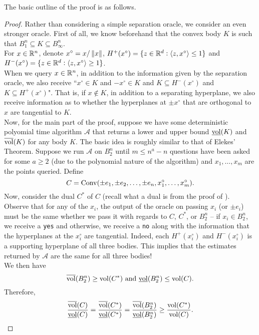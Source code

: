 The basic outline of the proof is as follows.\\

\begin{proof}
	Rather than considering a simple separation oracle, we consider an even stronger oracle. First of all, we know beforehand that the convex body $K$ is such that $B_1^n\subseteq K\subseteq B_\infty^n$.\\
	For $x\in\mathbb{R}^n$, denote $x^\circ = x/\left\lVert x\right\rVert$, $H^+(x^\circ) = \{ z\in\mathbb{R}^d:\langle z,x^\circ \rangle \leq 1 \}$ and $H^-(x^\circ) = \{ z\in\mathbb{R}^d:\langle z,x^\circ \rangle \geq 1 \}$.\\

	When we query $x\in\mathbb{R}^n$, in addition to the information given by the separation oracle, we also receive ``$x^\circ\in K$ and $-x^\circ\in K$ and $K\subseteq H^-(x^\circ)$ and $K\subseteq H^+(x^\circ)$". That is, if $x\not\in K$, in addition to a separating hyperplane, we also receive information as to whether the hyperplanes at $\pm x^\circ$ that are orthogonal to $x$ are tangential to $K$.\\

	Now, for the main part of the proof, suppose we have some deterministic polyomial time algorithm $\mathcal{A}$ that returns a lower and upper bound $\underline{\operatorname{vol}}(K)$ and $\overline{\operatorname{vol}}(K)$ for any body $K$. The basic idea is roughly similar to that of Elekes' Theorem. Suppose we run $\mathcal{A}$ on $B_2^n$ until $m\leq n^a - n$ questions have been asked for some $a\geq 2$ (due to the polynomial nature of the algorithm) and $x_1,\ldots,x_m$ are the points queried. Define
	\[ C = \operatorname{Conv}(\pm e_1, \pm e_2, \ldots, \pm e_n, x_1^\circ, \ldots, x_m^\circ). \]
	Now, consider the dual $C^*$ of $C$ (recall what a dual is from the proof of ). Observe that for any of the $x_i$, the output of the oracle on passing $x_i$ (or $\pm e_i$) must be the same whether we pass it with regards to $C$, $C^*$, or $B_2^n$ -- if $x_i\in B_2^n$, we receive a \texttt{yes} and otherwise, we receive a \texttt{no} along with the information that the hyperplanes at the $x_i^\circ$ are tangential. Indeed, each $H^+(x_i^\circ)$ and $H^-(x_i^\circ)$ is a supporting hyperplane of all three bodies. This implies that the estimates returned by $\mathcal{A}$ are the same for all three bodies!\\
	We then have
	\[ \overline{\operatorname{vol}}(B_2^n) \geq \operatorname{vol}(C^*)\text{ and }\underline{\operatorname{vol}}(B_2^n) \leq \operatorname{vol}(C). \]
	Therefore,
	\[ \frac{\overline{\operatorname{vol}}(C)}{\underline{\operatorname{vol}}(C)} = \frac{\overline{\operatorname{vol}}(C^*)}{\underline{\operatorname{vol}}(C^*)} = \frac{\overline{\operatorname{vol}}(B_2^n)}{\underline{\operatorname{vol}}(B_2^n)} \geq \frac{\operatorname{vol}(C^*)}{\operatorname{vol}(C)}. \]
\end{proof}

